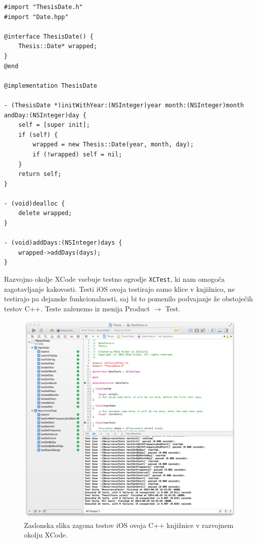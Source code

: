 \lstset{language=[Objective]C, breaklines}
\begin{lstlisting}[caption={Primer Objective-C++ ovoja C++ razreda \texttt{Date}.}, label=code:ios-wrapper]
#import "ThesisDate.h"
#import "Date.hpp"

@interface ThesisDate() {
    Thesis::Date* wrapped;
}
@end

@implementation ThesisDate

- (ThesisDate *)initWithYear:(NSInteger)year month:(NSInteger)month andDay:(NSInteger)day {
    self = [super init];
    if (self) {
        wrapped = new Thesis::Date(year, month, day);
        if (!wrapped) self = nil;
    }
    return self;
}

- (void)dealloc {
    delete wrapped;
}

- (void)addDays:(NSInteger)days {
    wrapped->addDays(days);
}
\end{lstlisting}

Razvojno okolje XCode vsebuje testno ogrodje \texttt{XCTest}, ki nam omogoča zagotavljanje kakovosti. Testi iOS ovoja testirajo samo klice v knjižnico, ne testirajo pa dejanske funkcionalnosti, saj bi to pomenilo podvajanje že obstoječih testov C++. Teste zaženemo iz menija Product $\rightarrow$ Test.

\begin{figure}
 \includegraphics[width=\linewidth]{xcode-tests}
 \caption{Zaslonska slika zagona testov iOS ovoja C++ knjižnice v razvojnem okolju XCode.}
 \label{fig:xcode-tests}
\end{figure}

